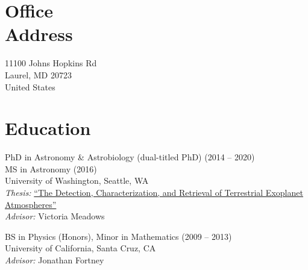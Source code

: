 \documentclass[margin,10pt]{res}
\begin{document}
\begin{resume}


\section{Office \\Address}
11100 Johns Hopkins Rd \\
Laurel, MD 20723 \\
United States \\

\section{Education} 
PhD in Astronomy \& Astrobiology (dual-titled PhD) \hfill (2014 -- 2020) \\
MS in Astronomy (2016) \\
University of Washington, Seattle, WA  \\
\textit{Thesis:} \href{https://digital.lib.washington.edu/researchworks/handle/1773/46370}{``The Detection, Characterization, and Retrieval of Terrestrial Exoplanet Atmospheres''} \\
\textit{Advisor:} Victoria Meadows 

BS in Physics (Honors), Minor in Mathematics \hfill (2009 -- 2013) \\
University of California, Santa Cruz, CA \\
\textit{Advisor:} Jonathan Fortney \\



\end{resume}
\end{document}
